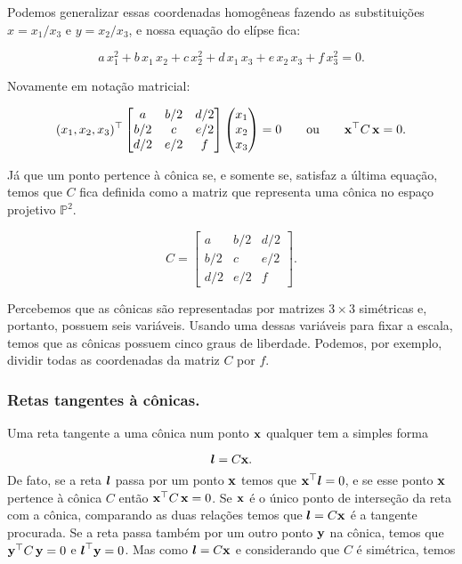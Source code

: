 Podemos generalizar essas coordenadas homogêneas fazendo as substituições $x = x_{1}/x_{3}$ e $y = x_{2}/x_{3}$, e nossa equação do elípse fica:

\begin{equation*}
a\,x_1^2+b\,x_1\,x_2+c\,x_2^2+d\,x_1\,x_3+e\,x_2\,x_3+f\,x_3^2=0.
\end{equation*}

Novamente em notação matricial:

\begin{equation*}
(x_1,x_2,x_3)^\top 
 \begin{bmatrix}
  a & b/2 & d/2\\
  b/2 & c & e/2\\
  d/2 & e/2 & f
  \end{bmatrix}
 \begin{pmatrix}
  x_1\\
  x_2\\
  x_3
  \end{pmatrix}
 = 0
 \qquad \text{ou} \qquad
 \mathbf{x}^\top C\,\mathbf{x} = 0.
\end{equation*}

Já que um ponto pertence à cônica se, e somente se, satisfaz a última equação, temos que $C$ fica definida como a matriz que representa uma cônica no espaço projetivo $\mathbb{P}^2$.

\begin{equation*}
C =  \begin{bmatrix}
      a & b/2 & d/2\\
      b/2 & c & e/2\\
      d/2 & e/2 & f
      \end{bmatrix}.
\end{equation*}

Percebemos que as cônicas são representadas por matrizes $3\times3$ simétricas e, portanto, possuem seis variáveis. Usando uma dessas variáveis para fixar a escala, temos que as cônicas possuem cinco graus de liberdade. Podemos, por exemplo, dividir todas as coordenadas da matriz $C$ por $f$. \\

\subsubsection{Retas tangentes à cônicas.} 

Uma reta tangente a uma cônica num ponto $\mathbf{x}$ qualquer tem a simples forma

\begin{equation*}
\boldsymbol{l}=C\mathbf{x}.
\end{equation*}
De fato, se a reta $\boldsymbol{l}$ passa por um ponto $\mathbf{x}$ temos que $\mathbf{x}^\top\boldsymbol{l}=0$, e se esse ponto $\mathbf{x}$ pertence à cônica $C$ então $\mathbf{x}^\top C\,\mathbf{x}=0$. Se $\mathbf{x}$ é o único ponto de interseção da reta com a cônica, comparando as duas relações  temos que $\boldsymbol{l}=C\mathbf{x}$ é a tangente procurada. Se a reta passa também por um outro ponto ${\bf y}$ na cônica, temos que ${\bf y}^\top C\,{\bf y}=0$ e $\boldsymbol{l}^\top{\bf y}=0$. Mas como $\boldsymbol{l}=C\mathbf{x}$ e considerando que $C$ é simétrica, temos

